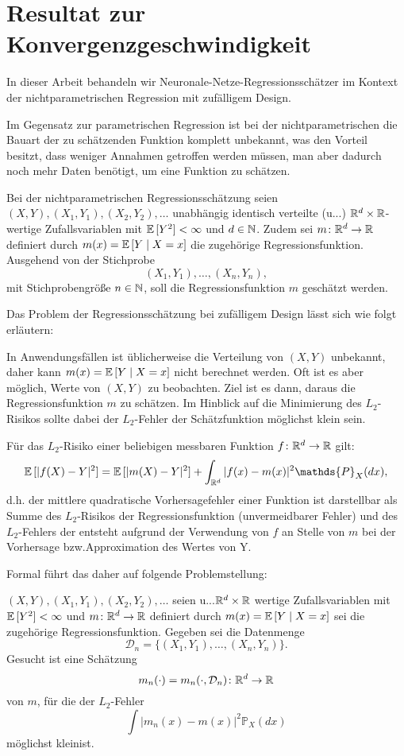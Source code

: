 \chapter{Resultat zur Konvergenzgeschwindigkeit}
\label{chap:3}

In dieser Arbeit behandeln wir Neuronale-Netze-Regressionsschätzer im Kontext der nichtparametrischen Regression mit zufälligem Design. 

Im Gegensatz zur parametrischen Regression ist bei der nichtparametrischen die Bauart der zu schätzenden Funktion komplett unbekannt, was den Vorteil besitzt, dass weniger Annahmen getroffen werden müssen, man aber dadurch noch mehr Daten benötigt, um eine Funktion zu schätzen.

Bei der nichtparametrischen Regressionsschätzung seien $(X, Y), (X_1, Y_1), (X_2, Y_2), \dots$ unabhängig identisch verteilte (u.\@i.\@v.\@) $\mathbb{R}^d \times \mathbb{R}$-wertige Zufallsvariablen mit $\mathbb{E}\,[Y^2] < \infty$ und $d \in \mathbb{N}$. Zudem sei $m\colon \mathbb{R}^d \to \mathbb{R}$ definiert durch $m(x) = \mathbb{E}\,[Y \mid X = x]$ die zugehörige Regressionsfunktion. Ausgehend von der Stichprobe
$$ (X_1, Y_1),\dots,(X_n, Y_n),$$ 
mit Stichprobengröße $n \in \mathbb{N}$, soll die Regressionsfunktion $m$ geschätzt werden.

Das Problem der Regressionsschätzung bei zufälligem Design lässt sich wie folgt erläutern: 

In Anwendungsfällen ist üblicherweise die Verteilung von $(X, Y)$ unbekannt, daher kann $m(x) = \mathbb{E}\,[Y \mid X = x]$ nicht berechnet werden. Oft ist es aber möglich, Werte von $(X, Y)$ zu beobachten. Ziel ist es dann, daraus die Regressionsfunktion $m$ zu schätzen. Im Hinblick auf die Minimierung des $L_2$-Risikos sollte dabei der $L_2$-Fehler der Schätzfunktion möglichst klein sein. 

Für das $L_2$-Risiko einer beliebigen messbaren Funktion $f\colon \mathbb{R}^d \to \mathbb{R}$  gilt:
$$\E[|f(X) - Y|^2] = \E[|m(X) - Y|^2] + \int_{\R^d}|f(x) - m(x)|^2 \mathds{P}_X (dx),$$
d.h. der mittlere quadratische Vorhersagefehler einer Funktion ist darstellbar als Summe des $L_2$-Risikos der Regressionsfunktion (unvermeidbarer Fehler) und des $L_2$-Fehlers der entsteht aufgrund der Verwendung von $f$ an Stelle von $m$ bei der Vorhersage bzw.\@ Approximation des Wertes von Y.

Formal führt das daher auf folgende Problemstellung:

$(X, Y), (X_1, Y_1), (X_2, Y_2), \dots$ seien u.\@i.\@v.\@ $\mathbb{R}^d \times \mathbb{R}$ wertige Zufallsvariablen mit $\mathbb{E}\,[Y^2] < \infty$ und $m\colon\mathbb{R}^d \to \mathbb{R}$ definiert durch $m(x) = \mathbb{E}\,[Y \mid X = x]$ sei die zugehörige Regressionsfunktion. Gegeben sei die Datenmenge 
$$ \mathcal{D}_n = \{(X_1, Y_1),\dots,(X_n, Y_n)\}.$$
Gesucht ist eine Schätzung 
$$m_n(\cdot) = m_n(\cdot, \mathcal{D}_n)\colon\mathbb{R}^d \to \mathbb{R} $$
von $m$, für die der $L_2$-Fehler 
$$\int |m_n(x) - m(x)|^2 \mathds{P}_X(dx)$$
möglichst \glqq klein\grqq\@ ist. \cite{gyoerfi2002}

